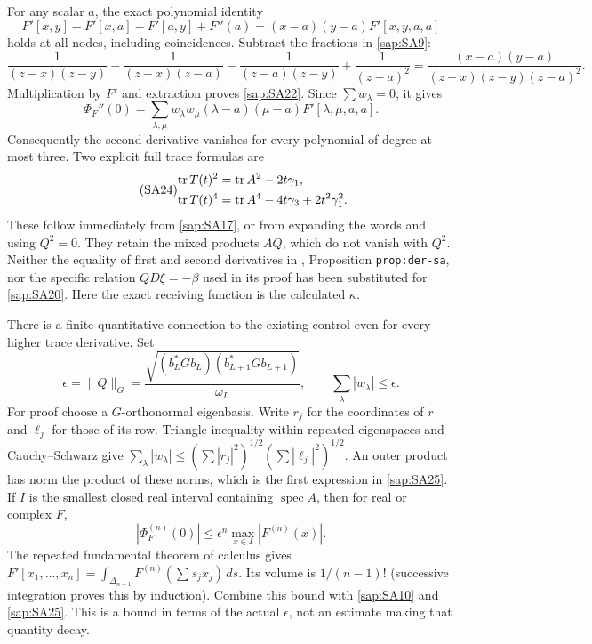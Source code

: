 \documentclass[11pt]{article}
\begin{document}
For any scalar $a$, the exact polynomial identity
\begin{equation}\tag{SA22}\label{sap:SA22}
F'[x,y]-F'[x,a]-F'[a,y]+F''(a)
=(x-a)(y-a)F'[x,y,a,a]
\end{equation}
holds at all nodes, including coincidences.
Subtract the fractions in \eqref{sap:SA9}:
\[
\frac1{(z-x)(z-y)}
-\frac1{(z-x)(z-a)}
-\frac1{(z-a)(z-y)}
+\frac1{(z-a)^2}
=\frac{(x-a)(y-a)}
       {(z-x)(z-y)(z-a)^2}.
\]
Multiplication by $F'$ and extraction proves
\eqref{sap:SA22}. Since $\sum w_\lambda=0$, it gives
\begin{equation}\tag{SA23}\label{sap:SA23}
\Phi_F''(0)=
\sum_{\lambda,\mu}w_\lambda w_\mu
(\lambda-a)(\mu-a)F'[\lambda,\mu,a,a].
\end{equation}
Consequently the second derivative vanishes for every
polynomial of degree at most three. Two explicit full
trace formulas are
\begin{equation}\tag{SA24}\label{sap:SA24}
\begin{split}
\operatorname{tr} T(t)^2&=\operatorname{tr} A^2-2t\gamma_1,\\
\operatorname{tr} T(t)^4&=\operatorname{tr} A^4-4t\gamma_3+2t^2\gamma_1^2 .
\end{split}
\end{equation}
These follow immediately from \eqref{sap:SA17}, or from
expanding the words and using $Q^2=0$. They retain the
mixed products $AQ$, which do not vanish with $Q^2$.
Neither the equality of first and second derivatives
in \cite{sap:CV}, Proposition \texttt{prop:der-sa}, nor the
specific relation $QD\xi=-\beta$ used in its proof has
been substituted for \eqref{sap:SA20}. Here the exact
receiving function is the calculated $\kappa$.

There is a finite quantitative connection to the existing
control even for every higher trace derivative. Set
\begin{equation}\tag{SA25}\label{sap:SA25}
\epsilon=\|Q\|_G
=\frac{\sqrt{(b_L^*Gb_L)(b_{L+1}^*Gb_{L+1})}}
 {\omega_L},\qquad
\sum_\lambda|w_\lambda|\leq\epsilon .
\end{equation}
For proof choose a $G$-orthonormal eigenbasis.
Write $r_j$ for the coordinates of $r$ and $\ell_j$ for
those of its row. Triangle inequality within repeated
eigenspaces and Cauchy--Schwarz give
$\sum_\lambda|w_\lambda|
\leq(\sum|r_j|^2)^{1/2}(\sum|\ell_j|^2)^{1/2}$.
An outer product has norm the product of these norms,
which is the first expression in \eqref{sap:SA25}.
If $I$ is the smallest closed real interval containing
$\operatorname{spec}A$, then for real or complex $F$,
\begin{equation}\tag{SA26}\label{sap:SA26}
|\Phi_F^{(n)}(0)|
\leq\epsilon^n\max_{x\in I}|F^{(n)}(x)|.
\end{equation}
The repeated fundamental theorem of calculus gives
$F'[x_1,\ldots,x_n]
=\int_{\Delta_{n-1}}F^{(n)}(\sum s_jx_j)\,ds$.
Its volume is $1/(n-1)!$ (successive integration proves
this by induction). Combine this bound with
\eqref{sap:SA10} and \eqref{sap:SA25}. This is a bound in terms
of the actual $\epsilon$, not an estimate making that
quantity decay.
\end{document}
